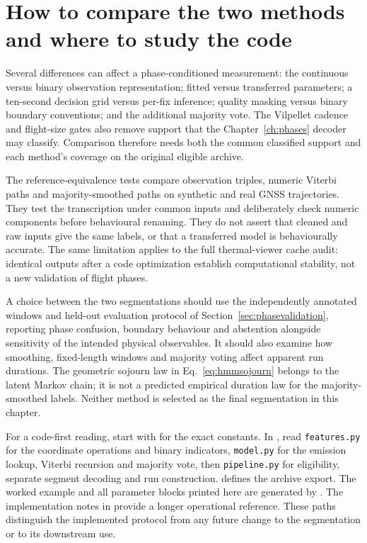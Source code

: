 \section{How to compare the two methods and where to study the code}
\label{sec:vilpellet-comparison}
Several differences can affect a phase-conditioned measurement: the continuous versus
binary observation representation; fitted versus transferred parameters; a ten-second
decision grid versus per-fix inference; quality masking versus binary boundary
conventions; and the additional majority vote. The Vilpellet cadence and flight-size
gates also remove support that the Chapter~\ref{ch:phases} decoder may classify.
Comparison therefore needs both the common classified support and each method's
coverage on the original eligible archive.

The reference-equivalence tests compare observation triples, numeric Viterbi paths
and majority-smoothed paths on synthetic and real GNSS trajectories. They test the
transcription under common inputs and deliberately check numeric components before
behavioural renaming. They do not assert that cleaned and raw inputs give the same
labels, or that a transferred model is behaviourally accurate. The same limitation
applies to the full thermal-viewer cache audit: identical outputs after a code
optimization establish computational stability, not a new validation of flight phases.

A choice between the two segmentations should use the independently annotated
windows and held-out evaluation protocol of Section~\ref{sec:phasevalidation},
reporting phase confusion, boundary behaviour and abstention alongside sensitivity
of the intended physical observables. It should also examine how smoothing,
fixed-length windows and majority voting affect apparent run durations. The geometric
sojourn law in Eq.~\eqref{eq:hmmsojourn} belongs to the latent Markov chain; it is not
a predicted empirical duration law for the majority-smoothed labels. Neither method
is selected as the final segmentation in this chapter.

For a code-first reading, start with
 for the exact constants. In
, read
\texttt{features.py} for the coordinate operations and binary indicators,
\texttt{model.py} for the emission lookup, Viterbi recursion and majority vote,
then \texttt{pipeline.py} for eligibility, separate segment decoding and run
construction.  defines the archive export.
The worked example and all parameter blocks printed here are generated by
.
The implementation notes in  provide a
longer operational reference. These paths distinguish the implemented protocol from
any future change to the segmentation or to its downstream use.
